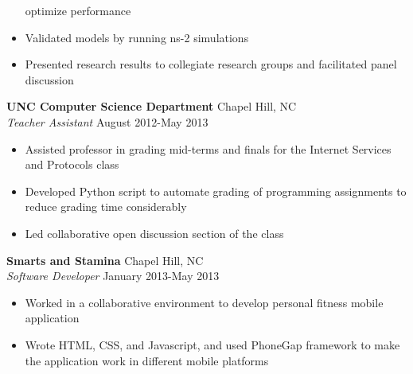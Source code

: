 \documentclass[line,margin,letterpaper]{res}
\begin{document}
\begin{resume}
\begin{itemize}
    optimize performance
    \item Validated models by running ns-2 simulations
    \item Presented research results to collegiate research groups and
    facilitated panel discussion
  \end{itemize}
  {\bf UNC Computer Science Department}
  \hfill Chapel Hill, NC \\
  \emph{Teacher Assistant} \hfill August 2012-May 2013
  \begin{itemize} \itemsep -2pt
    \item Assisted professor in grading mid-terms and finals for the Internet
    Services and Protocols class
    \item Developed Python script to automate grading of programming
    assignments to reduce grading time considerably
    \item Led collaborative open discussion section of the class
  \end{itemize}
  {\bf Smarts and Stamina} \hfill Chapel Hill, NC \\
  \emph{Software Developer} \hfill January 2013-May 2013
  \begin{itemize} \itemsep -2pt
    \item Worked in a collaborative environment to develop personal fitness
    mobile application
    \item Wrote HTML, CSS, and Javascript, and used PhoneGap framework to make
    the application work in different mobile platforms
  \end{itemize}

\end{resume}
\end{document}
